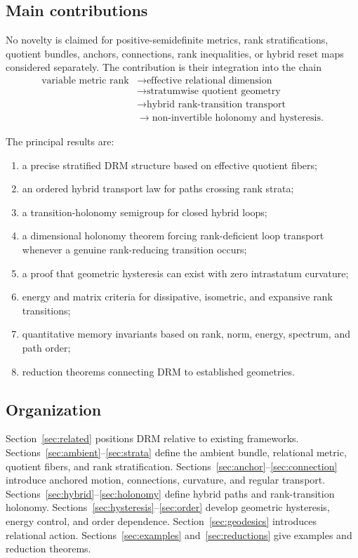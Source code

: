\documentclass[11pt]{article}
\begin{document}
\subsection{Main contributions}

No novelty is claimed for positive-semidefinite metrics, rank
stratifications, quotient bundles, anchors, connections, rank inequalities,
or hybrid reset maps considered separately. The contribution is their
integration into the chain
\[
\begin{aligned}
\text{variable metric rank}
&\longrightarrow \text{effective relational dimension}
\\
&\longrightarrow \text{stratumwise quotient geometry}
\\
&\longrightarrow \text{hybrid rank-transition transport}
\\
&\longrightarrow \text{non-invertible holonomy and hysteresis}.
\end{aligned}
\]

The principal results are:
\begin{enumerate}[label=(\roman*)]
\item a precise stratified DRM structure based on effective quotient fibers;
\item an ordered hybrid transport law for paths crossing rank strata;
\item a transition-holonomy semigroup for closed hybrid loops;
\item a dimensional holonomy theorem forcing rank-deficient loop transport
whenever a genuine rank-reducing transition occurs;
\item a proof that geometric hysteresis can exist with zero intrastatum
curvature;
\item energy and matrix criteria for dissipative, isometric, and expansive
rank transitions;
\item quantitative memory invariants based on rank, norm, energy, spectrum,
and path order;
\item reduction theorems connecting DRM to established geometries.
\end{enumerate}

\subsection{Organization}

Section~\ref{sec:related} positions DRM relative to existing frameworks.
Sections~\ref{sec:ambient}--\ref{sec:strata} define the ambient bundle,
relational metric, quotient fibers, and rank stratification.
Sections~\ref{sec:anchor}--\ref{sec:connection} introduce anchored motion,
connections, curvature, and regular transport.
Sections~\ref{sec:hybrid}--\ref{sec:holonomy} define hybrid paths and
rank-transition holonomy.
Sections~\ref{sec:hysteresis}--\ref{sec:order} develop geometric hysteresis,
energy control, and order dependence.
Section~\ref{sec:geodesics} introduces relational action.
Sections~\ref{sec:examples} and~\ref{sec:reductions} give examples and
reduction theorems.
\end{document}
